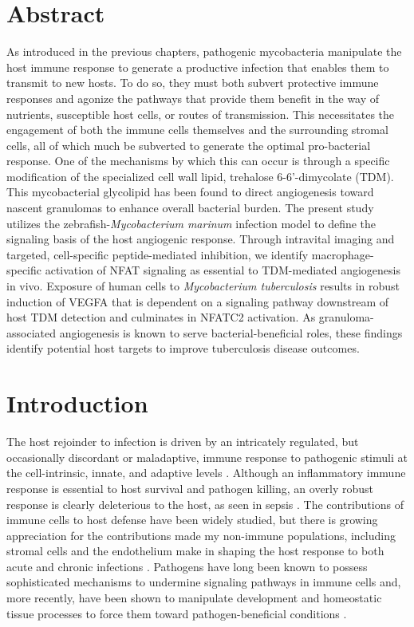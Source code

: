 \section{Abstract}

As introduced in the previous chapters, pathogenic mycobacteria manipulate the host immune response to generate a productive infection that enables them to transmit to new hosts. To do so, they must both subvert protective immune responses and agonize the pathways that provide them benefit in the way of nutrients, susceptible host cells, or routes of transmission. This necessitates the engagement of both the immune cells themselves and the surrounding stromal cells, all of which much be subverted to generate the optimal pro-bacterial response. One of the mechanisms by which this can occur is through a specific modification of the specialized cell wall lipid, trehalose 6-6'-dimycolate (TDM). This mycobacterial glycolipid has been found to direct angiogenesis toward nascent granulomas to enhance overall bacterial burden. The present study utilizes the zebrafish-\textit{Mycobacterium marinum} infection model to define the signaling basis of the host angiogenic response. Through intravital imaging and targeted, cell-specific peptide-mediated inhibition, we identify macrophage-specific activation of NFAT signaling as essential to TDM-mediated angiogenesis in vivo.  Exposure of human cells to \textit{Mycobacterium tuberculosis} results in robust induction of VEGFA that is dependent on a signaling pathway downstream of host TDM detection and culminates in NFATC2 activation. As granuloma-associated angiogenesis is known to serve bacterial-beneficial roles, these findings identify potential host targets to improve tuberculosis disease outcomes.

\section{Introduction}

The host rejoinder to infection is driven by an intricately regulated, but occasionally discordant or maladaptive, immune response to pathogenic stimuli at the cell-intrinsic, innate, and adaptive levels \citep{Iwasaki2010, Finlay2006, Haldar2015}. Although an inflammatory immune response is essential to host survival and pathogen killing, an overly robust response is clearly deleterious to the host, as seen in sepsis \citep{Finethy2020}. The contributions of immune cells to host defense have been widely studied, but there is growing appreciation for the contributions made my non-immune populations, including stromal cells and the endothelium \citep{Honan2021, MacMicking2012, Worrell2021, Amersfoort2022, Honan2021} make in shaping the host response to both acute and chronic infections \citep{Mueller2009, Randow2013, Krishnamurty2020}. Pathogens have long been known to possess sophisticated mechanisms to undermine signaling pathways in immune cells and, more recently, have been shown to manipulate development and homeostatic tissue processes to force them toward pathogen-beneficial conditions \citep{Menzies1998, Guichard2013}.

